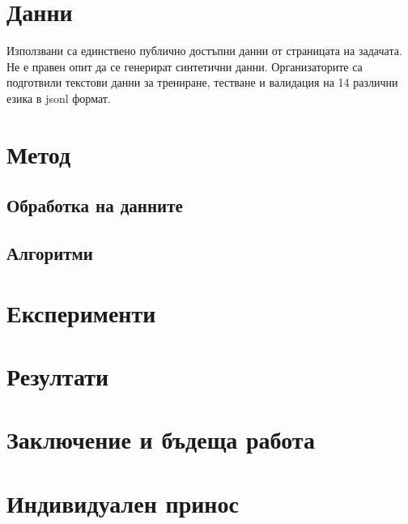 \documentclass[12pt]{article}
\begin{document}
	\section{Данни}
	
	Използвани са единствено публично достъпни данни от страницата на задачата. Не е правен опит да се генерират синтетични данни. Организаторите са подготвили текстови данни за трениране, тестване и валидация на 14 различни езика в jsonl формат. 
	
	\section{Метод}
	
	\subsection{Обработка на данните}
	
	\subsection{Алгоритми}
	
	\section{Експерименти}
	
	\section{Резултати}
	
	\section{Заключение и бъдеща работа}
	
	\pagebreak
	\section{Индивидуален принос}
	
	
\end{document}
